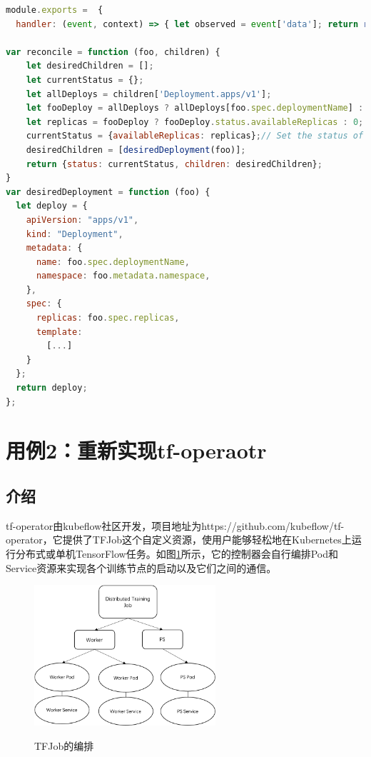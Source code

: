 \documentclass[macfonts,master]{njuthesis}
\begin{document}
\begin{lstlisting}[language=JavaScript,caption=sample-controller的实现代码,label=listing:sample-controller]
module.exports =  {
  handler: (event, context) => { let observed = event['data']; return reconcile(observed.parent, observed.children);} };

var reconcile = function (foo, children) {
    let desiredChildren = [];
    let currentStatus = {};
    let allDeploys = children['Deployment.apps/v1'];
    let fooDeploy = allDeploys ? allDeploys[foo.spec.deploymentName] : null;
    let replicas = fooDeploy ? fooDeploy.status.availableReplicas : 0;
    currentStatus = {availableReplicas: replicas};// Set the status of Foo
    desiredChildren = [desiredDeployment(foo)];
    return {status: currentStatus, children: desiredChildren};
}
var desiredDeployment = function (foo) {
  let deploy = {
    apiVersion: "apps/v1",
    kind: "Deployment",
    metadata: {
      name: foo.spec.deploymentName,
      namespace: foo.metadata.namespace,
    },
    spec: {
      replicas: foo.spec.replicas,
      template: 
      	[...]
    }
  };
  return deploy;
};
\end{lstlisting}


\section{用例2：重新实现tf-operaotr}
\subsection{介绍}
tf-operator由kubeflow社区开发，项目地址为https://github.com/kubeflow/tf-operator，它提供了TFJob这个自定义资源，使用户能够轻松地在Kubernetes上运行分布式或单机TensorFlow任务。如图\ref{fig:tfjobtrans}所示，它的控制器会自行编排Pod和Service资源来实现各个训练节点的启动以及它们之间的通信。

\begin{figure}[htbp]
  \centering
  \includegraphics[width=0.6\textwidth]{pics/tfjobtrans.png}\\
  \caption{TFJob的编排}\label{fig:tfjobtrans}
\end{figure}
\end{document}
